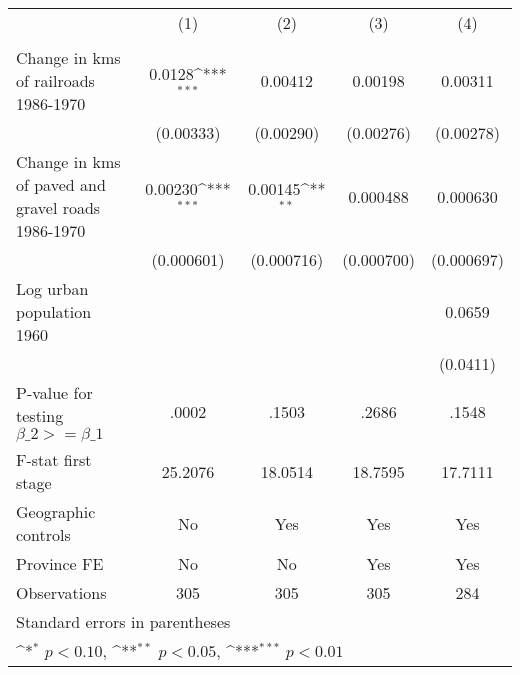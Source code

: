 {
\def\sym#1{\ifmmode^{#1}\else\(^{#1}\)\fi}
\begin{tabular}{l*{4}{c}}
\hline\hline
                &\multicolumn{1}{c}{(1)}&\multicolumn{1}{c}{(2)}&\multicolumn{1}{c}{(3)}&\multicolumn{1}{c}{(4)}\\
                &\multicolumn{1}{c}{}&\multicolumn{1}{c}{}&\multicolumn{1}{c}{}&\multicolumn{1}{c}{}\\
\hline
Change in kms of railroads 1986-1970&   0.0128\sym{***}&  0.00412         &  0.00198         &  0.00311         \\
                &(0.00333)         &(0.00290)         &(0.00276)         &(0.00278)         \\
[1em]
Change in kms of paved and gravel roads 1986-1970&  0.00230\sym{***}&  0.00145\sym{**} & 0.000488         & 0.000630         \\
                &(0.000601)         &(0.000716)         &(0.000700)         &(0.000697)         \\
[1em]
Log urban population 1960&                  &                  &                  &   0.0659         \\
                &                  &                  &                  & (0.0411)         \\
\hline
P-value for testing $\beta\_{2} >= \beta\_{1}$&    .0002         &    .1503         &    .2686         &    .1548         \\
F-stat first stage&  25.2076         &  18.0514         &  18.7595         &  17.7111         \\
Geographic controls&       No         &      Yes         &      Yes         &      Yes         \\
Province FE     &       No         &       No         &      Yes         &      Yes         \\
Observations    &      305         &      305         &      305         &      284         \\
\hline\hline
\multicolumn{5}{l}{\footnotesize Standard errors in parentheses}\\
\multicolumn{5}{l}{\footnotesize \sym{*} \(p<0.10\), \sym{**} \(p<0.05\), \sym{***} \(p<0.01\)}\\
\end{tabular}
}
